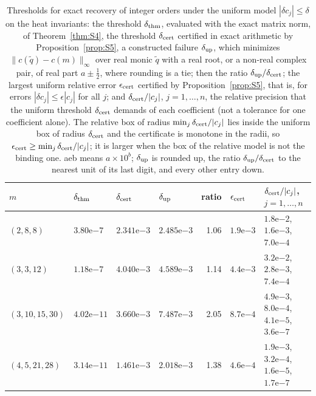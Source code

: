 \begin{table}[ht]
\caption{Thresholds for exact recovery of integer orders under the uniform model $|\delta c_j|\le\delta$ on the heat invariants: the threshold $\delta_{\rm thm}$, evaluated with the exact matrix norm, of Theorem~\ref{thm:S4}, the threshold $\delta_{\rm cert}$ certified in exact arithmetic by Proposition~\ref{prop:S5}, a constructed failure $\delta_{\rm up}$, which minimizes $\|c(\tilde q)-c(m)\|_\infty$ over real monic $\tilde q$ with a real root, or a non-real complex pair, of real part $a\pm\frac12$, where rounding is a tie; then the ratio $\delta_{\rm up}/\delta_{\rm cert}$; the largest uniform relative error $\epsilon_{\rm cert}$ certified by Proposition~\ref{prop:S5}, that is, for errors $|\delta c_j|\le\epsilon|c_j|$ for all $j$; and $\delta_{\rm cert}/|c_j|$, $j=1,\dots,n$, the relative precision that the uniform threshold $\delta_{\rm cert}$ demands of each coefficient (not a tolerance for one coefficient alone). The relative box of radius $\min_j\delta_{\rm cert}/|c_j|$ lies inside the uniform box of radius $\delta_{\rm cert}$ and the certificate is monotone in the radii, so $\epsilon_{\rm cert}\ge\min_j\delta_{\rm cert}/|c_j|$; it is larger when the box of the relative model is not the binding one. aeb means $a\times10^b$; $\delta_{\rm up}$ is rounded up, the ratio $\delta_{\rm up}/\delta_{\rm cert}$ to the nearest unit of its last digit, and every other entry down.}\label{tab:thresholdsfull}
\centering\footnotesize\setlength{\tabcolsep}{4pt}
\begin{tabular}{@{}llllrl>{\raggedright\arraybackslash}p{30mm}@{}}
\toprule
$m$ & $\delta_{\rm thm}$ & $\delta_{\rm cert}$ & $\delta_{\rm up}$ & ratio & $\epsilon_{\rm cert}$ & $\delta_{\rm cert}/|c_j|$, $j=1,\dots,n$\\
\midrule
$(2,8,8)$ & $3.80\text{e}{-7}$ & $2.341\text{e}{-3}$ & $2.485\text{e}{-3}$ & 1.06 & $1.9\text{e}{-3}$ & $1.8\text{e}{-2}$, $1.6\text{e}{-3}$, $7.0\text{e}{-4}$ \\
$(3,3,12)$ & $1.18\text{e}{-7}$ & $4.040\text{e}{-3}$ & $4.589\text{e}{-3}$ & 1.14 & $4.4\text{e}{-3}$ & $3.2\text{e}{-2}$, $2.8\text{e}{-3}$, $7.4\text{e}{-4}$ \\
$(3,10,15,30)$ & $4.02\text{e}{-11}$ & $3.660\text{e}{-3}$ & $7.487\text{e}{-3}$ & 2.05 & $8.7\text{e}{-4}$ & $4.9\text{e}{-3}$, $8.0\text{e}{-4}$, $4.1\text{e}{-5}$, $3.6\text{e}{-7}$ \\
$(4,5,21,28)$ & $3.14\text{e}{-11}$ & $1.461\text{e}{-3}$ & $2.018\text{e}{-3}$ & 1.38 & $4.6\text{e}{-4}$ & $1.9\text{e}{-3}$, $3.2\text{e}{-4}$, $1.6\text{e}{-5}$, $1.7\text{e}{-7}$ \\

\end{tabular}
\end{table}
